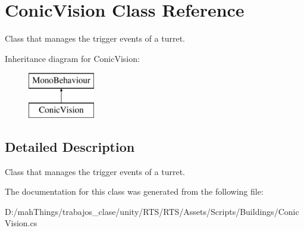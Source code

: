\hypertarget{class_conic_vision}{}\section{Conic\+Vision Class Reference}
\label{class_conic_vision}


Class that manages the trigger events of a turret.  


Inheritance diagram for Conic\+Vision\+:\begin{figure}[H]
\begin{center}
\leavevmode
\includegraphics[height=2.000000cm]{class_conic_vision}
\end{center}
\end{figure}


\subsection{Detailed Description}
Class that manages the trigger events of a turret. 



The documentation for this class was generated from the following file\+:\begin{DoxyCompactItemize}
\item 
D\+:/mah\+Things/trabajos\+\_\+clase/unity/\+R\+T\+S/\+R\+T\+S/\+Assets/\+Scripts/\+Buildings/Conic\+Vision.\+cs\end{DoxyCompactItemize}

